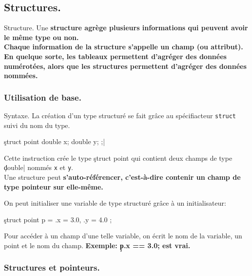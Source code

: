 \documentclass[french, 11pt]{article}
\begin{document}
\subsection{Structures.}

\begin{defi}{Structure.}{}
    Une \bf{structure} agrège plusieurs informations qui peuvent avoir le même type ou non.\\
    Chaque information de la structure s'appelle un \bf{champ} (ou attribut).\\
    En quelque sorte, les tableaux permettent d'agréger des données numérotées, alors que les structures permettent d'agréger des données nommées.
\end{defi}

\subsubsection{Utilisation de base.}

\begin{defi}{Syntaxe.}{}
    La création d'un type structuré se fait grâce au spécifiacteur \texttt{struct} suivi du nom du type.
    \begin{center}
        \c struct point { double x; double y; };|
    \end{center}
    Cette instruction crée le type \c{struct point} qui contient deux champs de type \c{double}| nommés \texttt{x} et \texttt{y}.\\
    Une structure peut \bf{s'auto-référencer}, c'est-à-dire contenir un champ de type pointeur sur elle-même.
\end{defi}

\begin{defi}{}{}
    On peut initialiser une variable de type structuré grâce à un initialisateur:
    \begin{center}
        \c{struct point p = { .x = 3.0, .y = 4.0 };}
    \end{center}
    Pour accéder à un champ d'une telle variable, on écrit le nom de la variable, un point et le nom du champ.\n
    \bf{Exemple:} \c{p.x == 3.0;} est vrai.
\end{defi}

\subsubsection{Structures et pointeurs.}
\end{document}
